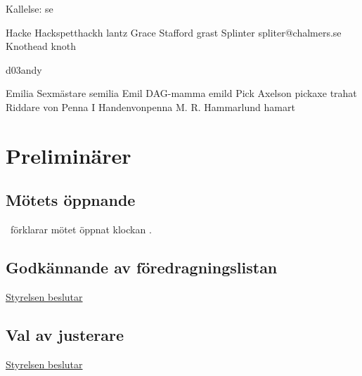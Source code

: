 \documentclass{dTeX-minutes}
\begin{document}
  \maketitle
  \pagestyle{DTek-minute}

  Kallelse: se 

  \begin{funktionarer}
         {Hacke Hackspett}{hackh}
       {lantz}
             {Grace Stafford} {grast}
        {Splinter}       {spliter@chalmers.se}
               {Knothead}       {knoth}

       {d03andy}

        {Emilia Sexmästare}         {semilia}
       {Emil DAG-mamma}            {emild}
     {Pick Axelson}              {pickaxe}
                    {trahat}
       {Riddare von Penna I Handen}{vonpenna}
     {M. R. Hammarlund}          {hamart}


  \end{funktionarer}

  \section{Preliminärer}
  \subsection{Mötets öppnande}
    \ordf\ förklarar mötet öppnat klockan \TheStartTime.
  \subsection{Godkännande av föredragningslistan}
    \underline{Styrelsen beslutar}\\
  \subsection{Val av justerare}
    \underline{Styrelsen beslutar}\\
\end{document}
